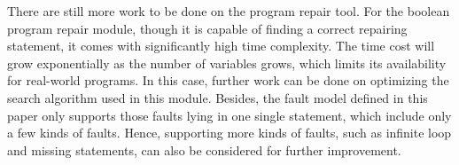 \documentclass[10pt,journal,final,]{article}
\theoremstyle{definition}
\begin{document}
There are still more work to be done on the program repair tool.
For the boolean program repair module, though it is capable of finding a correct repairing statement, it comes with significantly high time complexity.
The time cost will grow exponentially as the number of variables grows, which limits its availability for real-world programs.
In this case, further work can be done on optimizing the search algorithm used in this module.
Besides, the fault model defined in this paper only supports those faults lying in one single statement, which include only a few kinds of faults.
Hence, supporting more kinds of faults, such as infinite loop and missing statements, can also be considered for further improvement.

\newpage
{}

\end{document}
